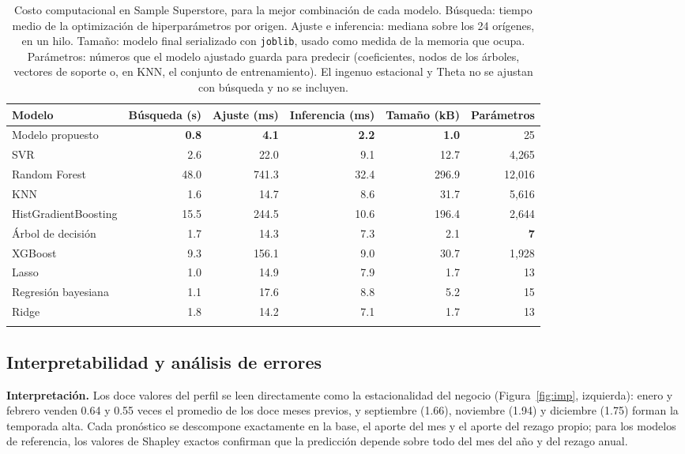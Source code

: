 \documentclass[pdflatex,sn-mathphys-num]{sn-jnl}
\theoremstyle{thmstyleone}
\begin{document}
\begin{table}[!htb]
\caption{Costo computacional en Sample Superstore, para la mejor combinación de cada modelo. Búsqueda: tiempo medio de la optimización de hiperparámetros por origen. Ajuste e inferencia: mediana sobre los 24 orígenes, en un hilo. Tamaño: modelo final serializado con \texttt{joblib}, usado como medida de la memoria que ocupa. Parámetros: números que el modelo ajustado guarda para predecir (coeficientes, nodos de los árboles, vectores de soporte o, en KNN, el conjunto de entrenamiento). El ingenuo estacional y Theta no se ajustan con búsqueda y no se incluyen.}\label{tab:costo}
\footnotesize
\begin{tabular*}{\textwidth}{@{\extracolsep\fill}lrrrrr}
\toprule
Modelo & Búsqueda (s) & Ajuste (ms) & Inferencia (ms) & Tamaño (kB) & Parámetros \\
\midrule
Modelo propuesto & \textbf{0.8} & \textbf{4.1} & \textbf{2.2} & \textbf{1.0} & 25 \\
SVR & 2.6 & 22.0 & 9.1 & 12.7 & 4{,}265 \\
Random Forest & 48.0 & 741.3 & 32.4 & 296.9 & 12{,}016 \\
KNN & 1.6 & 14.7 & 8.6 & 31.7 & 5{,}616 \\
HistGradientBoosting & 15.5 & 244.5 & 10.6 & 196.4 & 2{,}644 \\
Árbol de decisión & 1.7 & 14.3 & 7.3 & 2.1 & \textbf{7} \\
XGBoost & 9.3 & 156.1 & 9.0 & 30.7 & 1{,}928 \\
Lasso & 1.0 & 14.9 & 7.9 & 1.7 & 13 \\
Regresión bayesiana & 1.1 & 17.6 & 8.8 & 5.2 & 15 \\
Ridge & 1.8 & 14.2 & 7.1 & 1.7 & 13 \\
\botrule
\end{tabular*}
\end{table}

\subsection{Interpretabilidad y análisis de errores}\label{subsec:errores}

\textbf{Interpretación.} Los doce valores del perfil se leen directamente como la estacionalidad del negocio (Figura~\ref{fig:imp}, izquierda): enero y febrero venden 0.64 y 0.55 veces el promedio de los doce meses previos, y septiembre (1.66), noviembre (1.94) y diciembre (1.75) forman la temporada alta. Cada pronóstico se descompone exactamente en la base, el aporte del mes y el aporte del rezago propio; para los modelos de referencia, los valores de Shapley exactos confirman que la predicción depende sobre todo del mes del año y del rezago anual.
\end{document}
